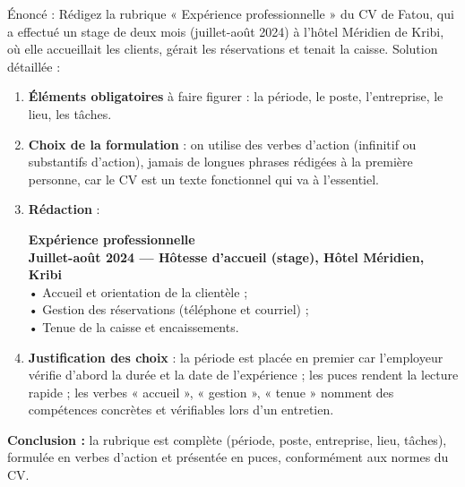 \documentclass[11pt]{article}
\newcommand{\cle}[1]{{\popxbold\color{popdark}#1}}
\begin{document}
\begin{exoresolu}
Énoncé : Rédigez la rubrique « Expérience professionnelle » du CV de Fatou, qui a effectué un stage de deux mois (juillet-août 2024) à l'hôtel Méridien de Kribi, où elle accueillait les clients, gérait les réservations et tenait la caisse.
\tcblower
Solution détaillée :
\begin{enumerate}
\item \textbf{Éléments obligatoires} à faire figurer : la période, le poste, l'entreprise, le lieu, les tâches.
\item \textbf{Choix de la formulation} : on utilise des \cle{verbes d'action} (infinitif ou substantifs d'action), jamais de longues phrases rédigées à la première personne, car le CV est un texte fonctionnel qui va à l'essentiel.
\item \textbf{Rédaction} :
\begin{center}
\textbf{Expérience professionnelle}\\
\textbf{Juillet-août 2024 — Hôtesse d'accueil (stage), Hôtel Méridien, Kribi}\\
• Accueil et orientation de la clientèle ;\\
• Gestion des réservations (téléphone et courriel) ;\\
• Tenue de la caisse et encaissements.
\end{center}
\item \textbf{Justification des choix} : la période est placée en premier car l'employeur vérifie d'abord la durée et la date de l'expérience ; les puces rendent la lecture rapide ; les verbes « accueil », « gestion », « tenue » nomment des compétences concrètes et vérifiables lors d'un entretien.
\end{enumerate}
\textbf{Conclusion :} la rubrique est complète (période, poste, entreprise, lieu, tâches), formulée en verbes d'action et présentée en puces, conformément aux normes du CV.
\end{exoresolu}
\end{document}

